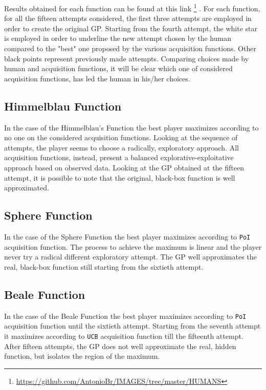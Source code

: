 Results obtained for each function can be found at this link \footnote{\url{https://github.com/AntonioBr/IMAGES/tree/master/HUMANS}} . For each function,  for all the fifteen attempts considered, the first three attempts are employed in order to create the original GP. Starting from the fourth attempt, the white star is employed in order to underline the new attempt chosen by the human compared to the "best" one proposed by the various acquisition functions. Other black points represent previously made attempts. Comparing choices made by human and acquisition functions, it will be clear which one of considered acquisition functions, has led the human in his/her choices.

\subsection{Himmelblau Function}
In the case of the Himmelblau's Function the best player maximizes according to no one on the considered acquisition functions. Looking at the sequence of attempts, the player seems to choose a radically, exploratory approach. All acquisition functions, instead, present a balanced explorative-exploitative approach based on observed data. Looking at the GP obtained at the fifteen attempt, it is possible to note that the original, black-box function is well approximated.

\subsection{Sphere Function}
In the case of the Sphere Function the best player maximizes according to {\tt PoI} acquisition function. The process to achieve the maximum is linear and the player never try a radical different exploratory attempt. The GP well approximates the real, black-box function still starting from the sixtieth attempt.

\subsection{Beale Function}
In the case of the Beale Function the best player maximizes according to {\tt PoI} acquisition function until the sixtieth attempt. Starting from the seventh attempt it maximizes according to {\tt UCB} acquisition function till the fifteenth attempt. After fifteen attempts, the GP does not well approximate the real, hidden function, but isolates the region of the maximum.

